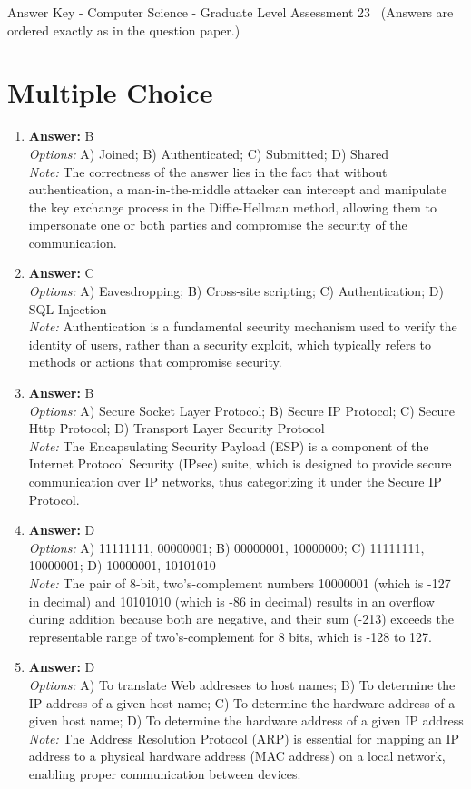 \documentclass[12pt]{article}
\begin{document}
\begin{center}
Answer Key - Computer Science - Graduate Level Assessment 23 \
\small (Answers are ordered exactly as in the question paper.)
\end{center}

\section*{Multiple Choice}
\begin{enumerate}[label=\arabic*.]
\item \textbf{Answer:} B
\\ \textit{Options:} A) Joined; B) Authenticated; C) Submitted; D) Shared
\\ \textit{Note:} The correctness of the answer lies in the fact that without authentication, a man-in-the-middle attacker can intercept and manipulate the key exchange process in the Diffie-Hellman method, allowing them to impersonate one or both parties and compromise the security of the communication.
\item \textbf{Answer:} C
\\ \textit{Options:} A) Eavesdropping; B) Cross-site scripting; C) Authentication; D) SQL Injection
\\ \textit{Note:} Authentication is a fundamental security mechanism used to verify the identity of users, rather than a security exploit, which typically refers to methods or actions that compromise security.
\item \textbf{Answer:} B
\\ \textit{Options:} A) Secure Socket Layer Protocol; B) Secure IP Protocol; C) Secure Http Protocol; D) Transport Layer Security Protocol
\\ \textit{Note:} The Encapsulating Security Payload (ESP) is a component of the Internet Protocol Security (IPsec) suite, which is designed to provide secure communication over IP networks, thus categorizing it under the Secure IP Protocol.
\item \textbf{Answer:} D
\\ \textit{Options:} A) 11111111, 00000001; B) 00000001, 10000000; C) 11111111, 10000001; D) 10000001, 10101010
\\ \textit{Note:} The pair of 8-bit, two's-complement numbers 10000001 (which is -127 in decimal) and 10101010 (which is -86 in decimal) results in an overflow during addition because both are negative, and their sum (-213) exceeds the representable range of two's-complement for 8 bits, which is -128 to 127.
\item \textbf{Answer:} D
\\ \textit{Options:} A) To translate Web addresses to host names; B) To determine the IP address of a given host name; C) To determine the hardware address of a given host name; D) To determine the hardware address of a given IP address
\\ \textit{Note:} The Address Resolution Protocol (ARP) is essential for mapping an IP address to a physical hardware address (MAC address) on a local network, enabling proper communication between devices.
\end{enumerate}
\end{document}
